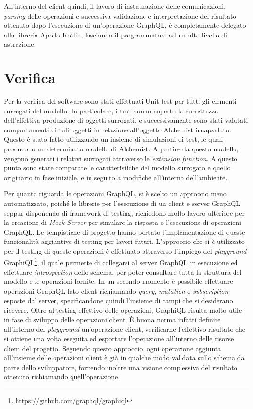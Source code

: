 All'interno del client quindi, il lavoro di instaurazione delle comunicazioni, \textit{parsing} delle operazioni e successiva validazione e interpretazione del risultato ottenuto dopo l'esecuzione
di un'operazione GraphQL, è completamente delegato alla libreria Apollo Kotlin, lasciando il programmatore ad un alto livello di astrazione.


\clearpage
\section{Verifica}\label{sec:testing}
Per la verifica del software sono stati effettuati Unit test per tutti gli elementi surrogati del modello. In particolare, i test hanno coperto la correttezza dell'effettiva 
produzione di oggetti surrogati, e successivamente sono stati valutati comportamenti di tali oggetti in relazione all'oggetto Alchemist incapsulato. Questo è stato fatto
utilizzando un insieme di simulazioni di test, le quali producono un determinato modello di Alchemist. A partire da questo modello, vengono generati i relativi surrogati
attraverso le \textit{extension function}. A questo punto sono state comparate le caratteristiche del modello surrogato e quello originario in fase iniziale, e in seguito
a modifiche all'interno dell'ambiente.

Per quanto riguarda le operazioni GraphQL, si è scelto un approccio meno automatizzato, poiché le librerie per l'esecuzione di un client e server GraphQL seppur disponendo di
framework di testing, richiedono molto lavoro ulteriore per la creazione di \textit{Mock Server} per simulare la risposta o l'esecuzione di operazioni GraphQL. Le tempistiche
di progetto hanno portato l'implementazione di queste funzionalità aggiuntive di testing per lavori futuri.
L'approccio che si è utilizzato per il testing di queste operazioni è effettuato attraverso l'impiego del \textit{playground} GraphiQL\footnote{https://github.com/graphql/graphiql},
il quale permette di collegarsi al server GraphQL in esecuzione ed effettuare \textit{introspection} dello schema, per poter consultare tutta la struttura del modello e le operazioni
fornite. In un secondo momento è possibile effettuare operazioni GraphQL lato client richiamando \textit{query}, \textit{mutation} e \textit{subscription} esposte dal server, specificandone
quindi l'insieme di campi che si desiderano ricevere. Oltre al testing effettivo delle operazioni, GraphiQL risulta molto utile in fase di sviluppo delle operazioni client. È buona
norma infatti definire all'interno del \textit{playground} un'operazione client, verificarne l'effettivo risultato che si ottiene una volta eseguita ed esportare l'operazione
all'interno delle risorse client del progetto. Seguendo questo approccio, ogni operazione aggiunta all'insieme delle operazioni client è già in qualche modo validata sullo schema
da parte dello sviluppatore, fornendo inoltre una visione complessiva del risultato ottenuto richiamando quell'operazione.

